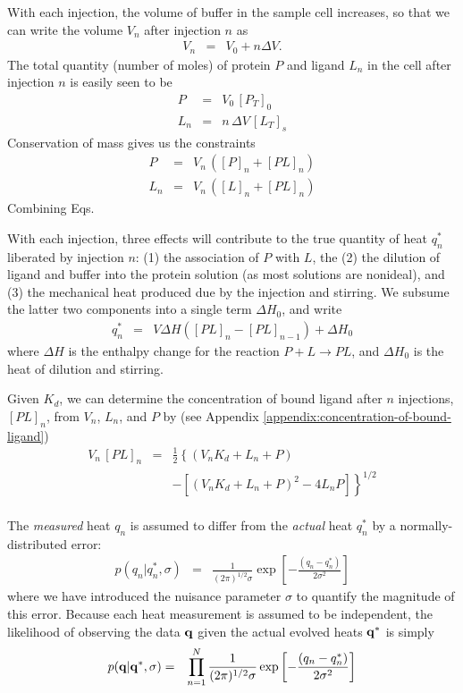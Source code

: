 \documentclass[aps,pre,twocolumn,nofootinbib,superscriptaddress,linenumbers]{revtex4-1}
\newcommand{\bfm}[1]{{\bf #1}}
\begin{document}
With each injection, the volume of buffer in the sample cell increases, so that we can write the volume $V_n$ after injection $n$ as
\begin{eqnarray}
V_n &=& V_0 + n \Delta V .
\end{eqnarray}
The total quantity (number of moles) of protein $P$ and ligand $L_n$ in the cell after injection $n$ is easily seen to be
\begin{eqnarray}
P &=& V_0 \, [P_T]_0 \nonumber \\
L_n &=& n \, \Delta V \, [L_T]_s
\end{eqnarray}
Conservation of mass gives us the constraints
\begin{eqnarray}
P &=& V_n \, ([P]_n + [PL]_n) \nonumber \\
L_n &=& V_n \, ([L]_n + [PL]_n) \label{equation:conservation-of-mass}
\end{eqnarray}
Combining Eqs.

With each injection, three effects will contribute to the true quantity of heat $q_n^*$ liberated by injection $n$: (1) the association of $P$ with $L$, the (2) the dilution of ligand and buffer into the protein solution (as most solutions are nonideal), and (3) the mechanical heat produced due by the injection and stirring.
We subsume the latter two components into a single term $\Delta H_0$, and write
\begin{eqnarray}
q_n^* &=& V \Delta H \left( [PL]_n - [PL]_{n-1} \right) + \Delta H_0 \label{equation:liberated-heat}
\end{eqnarray}
where $\Delta H$ is the enthalpy change for the reaction $P + L \rightarrow PL$, and $\Delta H_0$ is the heat of dilution and stirring.

Given $K_d$, we can determine the concentration of bound ligand after $n$ injections, $[PL]_n$, from $V_n$, $L_n$, and $P$ by (see Appendix \ref{appendix:concentration-of-bound-ligand})
\begin{eqnarray}
V_n \, [PL]_n &=& \frac{1}{2} \left\{ (V_n K_d + L_n + P) \right. \nonumber \\
&&- \left. \left[ (V_n K_d + L_n + P)^2 - 4 L_n P \right] \right\}^{1/2} \nonumber \\
\end{eqnarray}

The \emph{measured} heat $q_n$ is assumed to differ from the \emph{actual} heat $q_n^*$ by a normally-distributed error:
\begin{eqnarray}
p(q_n | q_n^*, \sigma) &=& \frac{1}{(2 \pi)^{1/2} \sigma} \exp\left[- \frac{(q_n - q_n^*)}{2 \sigma^2}\right]
\end{eqnarray}
where we have introduced the nuisance parameter $\sigma$ to quantify the magnitude of this error.
Because each heat measurement is assumed to be independent, the likelihood of observing the data $\bfm{q}$ given the actual evolved heats $\bfm{q}^*$ is simply
\begin{eqnarray}
p(\bfm{q} | \bfm{q}^*, \sigma) &=& \prod_{n=1}^N \frac{1}{(2 \pi)^{1/2} \sigma} \exp\left[- \frac{(q_n - q_n^*)}{2 \sigma^2}\right]
\end{eqnarray}
\end{document}

